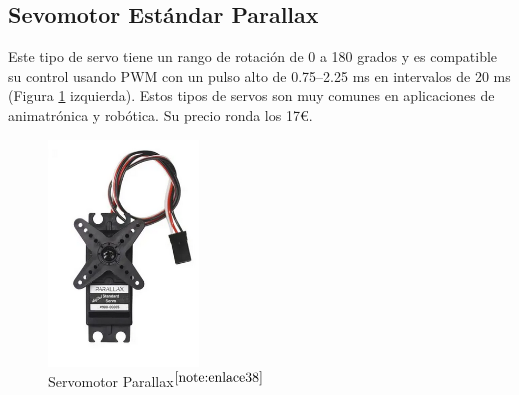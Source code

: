 \setcounter{footnote}{37} %


\subsection{Sevomotor Estándar Parallax}
Este tipo de servo tiene un rango de rotación de 0 a 180 grados y es compatible su control usando \ac{PWM} con un pulso alto de 0.75–2.25 ms en intervalos de 20 ms (Figura \ref{fig:parallax} izquierda). Estos tipos de servos son muy comunes en aplicaciones de animatrónica y robótica. Su precio ronda los 17€.



\begin{figure} [h!]
	\begin{center}
		\includegraphics[width=4cm]{figs/parallax.png}
	\end{center}
	\caption{Servomotor Parallax$^{\ref{note:enlace38}}$} 
	\label{fig:parallax}
\end{figure}\


